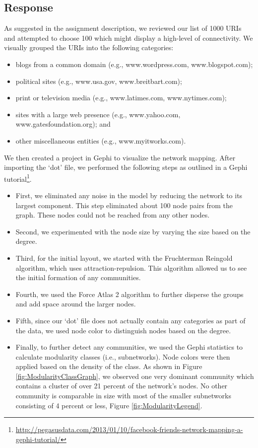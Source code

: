 \documentclass[letterpaper,11pt]{report}
\begin{document}
\begin{savenotes}
\subsection{Response}As suggested in the assignment description, we reviewed our list of 1000 URIs and attempted to choose 100 which might display a high-level of connectivity. We visually grouped the URIs into the following categories:
\begin{itemize}
\item blogs from a common domain (e.g., www.wordpress.com, www.blogspot.com);
\item political sites (e.g., www.usa.gov, www.breitbart.com);
\item print or television media (e.g., www.latimes.com, www.nytimes.com);
\item sites with a large web presence (e.g., www.yahoo.com, www.gatesfoundation.org); and
\item other miscellaneous entities (e.g., www.myitworks.com).
\end{itemize}
We then created a project in Gephi to visualize the network mapping. After importing the `dot' file, we performed the following steps as outlined in a Gephi tutorial\footnote{\url{http://pegasusdata.com/2013/01/10/facebook-friends-network-mapping-a-gephi-tutorial/}}.
\begin{itemize}
\item First, we eliminated any noise in the model by reducing the network to its largest component. This step eliminated about 100 node pairs from the graph. These nodes could not be reached from any other nodes.
\item Second, we experimented with the node size by varying the size based on the degree.
\item Third, for the initial layout, we started with the Fruchterman Reingold algorithm, which uses attraction-repulsion.  This algorithm allowed us to see the initial formation of any communities.
\item Fourth, we used the Force Atlas 2 algorithm to further disperse the groups and add space around the larger nodes.
\item Fifth, since our `dot' file does not actually contain any categories as part of the data, we used node color to distinguish nodes based on the degree.
\item Finally, to further detect any communities, we used the Gephi statistics to calculate modularity classes (i.e., subnetworks). Node colors were then applied based on the density of the class. As shown in Figure \ref{fig:ModularityClassGraph}, we observed one very dominant community which contains a cluster of over 21 percent of the network's nodes. No other community is comparable in size with most of the smaller subnetworks consisting of 4 percent or less, Figure \ref{fig:ModularityLegend}.
\end{itemize}


\end{savenotes}
\end{document}
